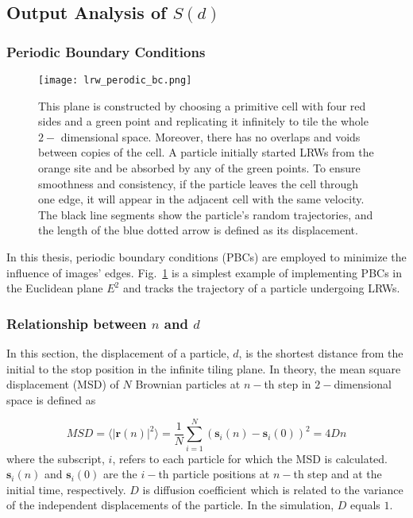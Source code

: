 


\subsection{Output Analysis of $S(d)$}


  \subsubsection{Periodic Boundary Conditions}

      \begin{figure}
         \centering
         \texttt{[image: lrw\_perodic\_bc.png]}
         \caption{This plane is constructed by choosing a primitive
           cell with four red sides and a green point and replicating
           it infinitely to tile the whole $2-$ dimensional
           space. Moreover, there has no overlaps and voids between
           copies of the cell. A particle initially started LRWs from
           the orange site and be absorbed by any of the green points.
           To ensure smoothness and consistency, if the particle
           leaves the cell through one edge, it will appear in the
           adjacent cell with the same velocity. The black line
           segments show the particle's random trajectories, and the
           length of the blue dotted arrow is defined as its
           displacement.}
         \label{fig:pbc_lrws}
      \end{figure}


      In this thesis, periodic boundary conditions (PBCs) are employed
      to minimize the influence of images'
      edges. Fig.~\ref{fig:pbc_lrws} is a simplest example of
      implementing PBCs in the Euclidean plane $E^2$ and tracks the
      trajectory of a particle undergoing LRWs. 




    \subsubsection{Relationship between $n$ and $d$}

     In this section, the displacement of a particle, $d$, is the
     shortest distance from the initial to the stop position in the
     infinite tiling plane. In theory, the mean square displacement
     (MSD) of $N$ Brownian particles at $n-$th step in $2-$dimensional
     space is defined as

     \begin{equation}\label{eq:mds_N}
       MSD = \langle \lvert \bm{r}(n) \lvert^2 \rangle = \frac{1}{N} \sum^{N}_{i=1} (\bm{s}_{i}(n) - \bm{s}_{i}(0))^2 = 4Dn
     \end{equation}
     where the subscript, $i$, refers to each particle for which the
     MSD is calculated. $\bm{s}_{i}(n)$ and $\bm{s}_{i}(0)$ are the
     $i-$th particle positions at $n-$th step and at the initial time,
     respectively. $D$ is diffusion coefficient which is related to
     the variance of the independent displacements of the
     particle. In the simulation, $D$ equals $1$.



